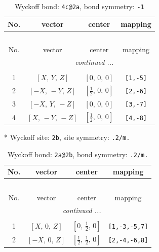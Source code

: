 \documentclass[fleqn,8pt]{jsarticle}
\begin{document}
\renewcommand{\arraystretch}{1.2}
\begin{longtable}{cccc}
\caption{Wyckoff bond: {\tt 4c@2a}, bond symmetry: {\tt -1}}
 \\
 \hline \hline
No. & vector & center & mapping \\ \hline \endfirsthead

\multicolumn{3}{l}{\tablename\ \thetable{}} \\
 \hline \hline
No. & vector & center & mapping \\ \hline \endhead

 \hline \hline
\multicolumn{3}{r}{\footnotesize\it continued ...} \\ \endfoot

 \hline \hline
\multicolumn{3}{r}{} \\ \endlastfoot

1 & $\left[ X,\, Y,\, Z \right]$ & $\left[ 0,\, 0,\, 0 \right]$ & {\tt [1,-5]} \\ \hline
2 & $\left[ - X,\, - Y,\, Z \right]$ & $\left[ \frac{1}{2},\, 0,\, 0 \right]$ & {\tt [2,-6]} \\ \hline
3 & $\left[ - X,\, Y,\, - Z \right]$ & $\left[ 0,\, 0,\, 0 \right]$ & {\tt [3,-7]} \\ \hline
4 & $\left[ X,\, - Y,\, - Z \right]$ & $\left[ \frac{1}{2},\, 0,\, 0 \right]$ & {\tt [4,-8]} \\
\end{longtable}
* Wyckoff site: {\tt 2b}, site symmetry: {\tt .2/m.}
\renewcommand{\arraystretch}{1.2}
\begin{longtable}{cccc}
\caption{Wyckoff bond: {\tt 2a@2b}, bond symmetry: {\tt .2/m.}}
 \\
 \hline \hline
No. & vector & center & mapping \\ \hline \endfirsthead

\multicolumn{3}{l}{\tablename\ \thetable{}} \\
 \hline \hline
No. & vector & center & mapping \\ \hline \endhead

 \hline \hline
\multicolumn{3}{r}{\footnotesize\it continued ...} \\ \endfoot

 \hline \hline
\multicolumn{3}{r}{} \\ \endlastfoot

1 & $\left[ X,\, 0,\, Z \right]$ & $\left[ 0,\, \frac{1}{2},\, 0 \right]$ & {\tt [1,-3,-5,7]} \\ \hline
2 & $\left[ - X,\, 0,\, Z \right]$ & $\left[ \frac{1}{2},\, \frac{1}{2},\, 0 \right]$ & {\tt [2,-4,-6,8]} \\
\end{longtable}
\end{document}

